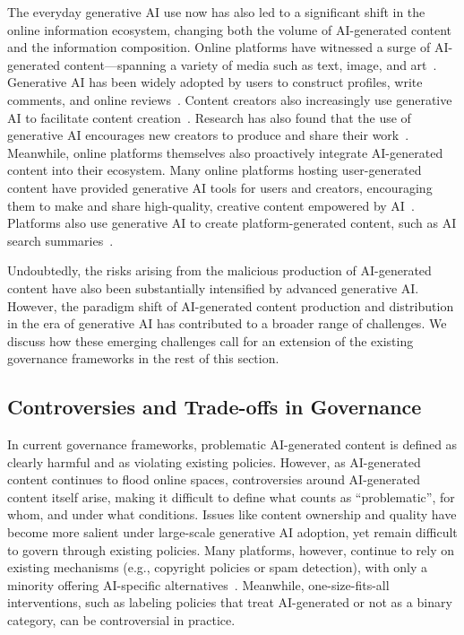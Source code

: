 The everyday generative AI use now has also led to a significant shift in the online information ecosystem, changing both the volume of AI-generated content and the information composition. Online platforms have witnessed a surge of AI-generated content---spanning a variety of media such as text, image, and art~\cite{liang2025widespread,matatov2024examining,wei2024understanding,sun2025we,guo2025exploring}. Generative AI has been widely adopted by users to construct profiles, write comments, and online reviews~\cite{shahid2025examining, jakesch2019ai, barkallah2026wanted}. Content creators also increasingly use generative AI to facilitate content creation~\cite{kim2024unlocking, lyu2024youtube}. Research has also found that the use of generative AI encourages new creators to produce and share their work~\cite{matatov2024examining, wei2024exploring}. Meanwhile, online platforms themselves also proactively integrate AI-generated content into their ecosystem. Many online platforms hosting user-generated content have provided generative AI tools for users and creators, encouraging them to make and share high-quality, creative content empowered by AI~\cite{gao2026governance}. Platforms also use generative AI to create platform-generated content, such as AI search summaries~\cite{gao2026governance, liu2026positivity}. 

Undoubtedly, the risks arising from the malicious production of AI-generated content have also been substantially intensified by advanced generative AI. However, the paradigm shift of AI-generated content production and distribution in the era of generative AI has contributed to a broader range of challenges. We discuss how these emerging challenges call for an extension of the existing governance frameworks in the rest of this section.

\subsection{Controversies and Trade-offs in Governance}
\label{subsec:contested}
In current governance frameworks, problematic AI-generated content is defined as clearly harmful and as violating existing policies. However, as AI-generated content continues to flood online spaces, controversies around AI-generated content itself arise, making it difficult to define what counts as ``problematic'', for whom, and under what conditions. Issues like content ownership and quality have become more salient under large-scale generative AI adoption, yet remain difficult to govern through existing policies. Many platforms, however, continue to rely on existing mechanisms (e.g., copyright policies or spam detection), with only a minority offering AI-specific alternatives~\cite{gao2026governance}. Meanwhile, one-size-fits-all interventions, such as labeling policies that treat AI-generated or not as a binary category, can be controversial in practice.


